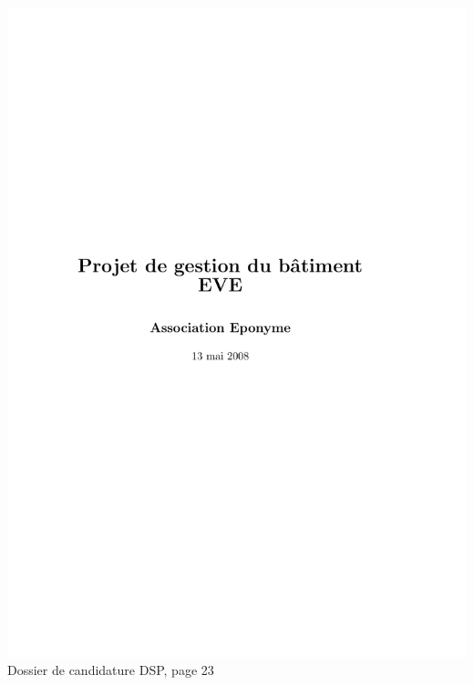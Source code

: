 \includegraphics[scale=0.85,trim=20mm 20mm 20mm 20mm,clip,page=23]{annexes/candidature_dsp.pdf} \\
Dossier de candidature DSP, page 23
\newpage
